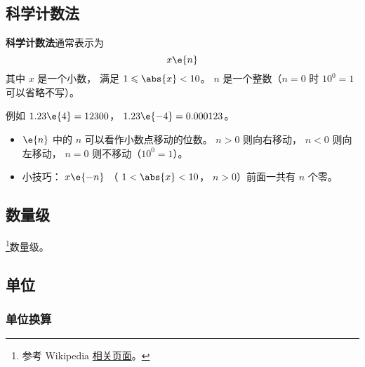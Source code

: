 
\begin{issues}
\issueDraft
\end{issues}

\subsection{科学计数法}
\textbf{科学计数法}通常表示为
\begin{equation}
x \e{n}
\end{equation}
其中 $x$ 是一个小数， 满足 $1 \leqslant \abs{x} < 10$。 $n$ 是一个整数（$n=0$ 时 $10^{0} = 1$ 可以省略不写）。

例如 $1.23\e{4} = 12300$， $1.23\e{-4} = 0.000123$。

\begin{itemize}
\item $\e{n}$ 中的 $n$ 可以看作小数点移动的位数。 $n > 0$ 则向右移动， $n < 0$ 则向左移动， $n=0$ 则不移动（$10^{0} = 1$）。
\item 小技巧： $x\e{-n}$ （ $1 < \abs{x} < 10$， $n > 0$）前面一共有 $n$ 个零。
\end{itemize}

\subsection{数量级}
\footnote{参考 Wikipedia \href{https://en.wikipedia.org/wiki/Order_of_magnitude}{相关页面}。}数量级。

\subsection{单位}

\subsubsection{单位换算}
